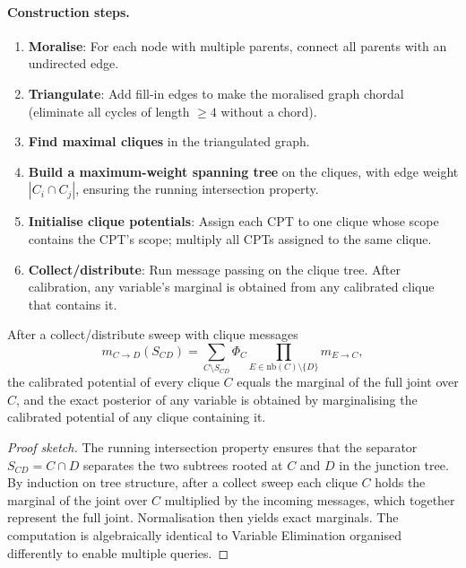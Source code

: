 \paragraph{Construction steps.}
\begin{enumerate}
\item \textbf{Moralise}: For each node with multiple parents, connect all
      parents with an undirected edge.
\item \textbf{Triangulate}: Add fill-in edges to make the moralised graph
      chordal (eliminate all cycles of length $\geq4$ without a chord).
\item \textbf{Find maximal cliques} in the triangulated graph.
\item \textbf{Build a maximum-weight spanning tree} on the cliques, with
      edge weight $|C_i\cap C_j|$, ensuring the running intersection
      property.
\item \textbf{Initialise clique potentials}: Assign each CPT to one clique
      whose scope contains the CPT's scope; multiply all CPTs assigned to
      the same clique.
\item \textbf{Collect/distribute}: Run message passing on the clique tree.
      After calibration, any variable's marginal is obtained from any
      calibrated clique that contains it.
\end{enumerate}

\begin{theorem}
After a collect/distribute sweep with clique messages
\[
m_{C\to D}(S_{CD})
=\sum_{C\setminus S_{CD}}\Phi_C\prod_{E\in\mathrm{nb}(C)\setminus\{D\}} m_{E\to C},
\]
the calibrated potential of every clique $C$ equals the marginal of the
full joint over $C$, and the exact posterior of any variable is obtained
by marginalising the calibrated potential of any clique containing it.
\end{theorem}

\begin{proof}[Proof sketch]
The running intersection property ensures that the separator $S_{CD}=C\cap D$
separates the two subtrees rooted at $C$ and $D$ in the junction tree.
By induction on tree structure, after a collect sweep each clique $C$
holds the marginal of the joint over $C$ multiplied by the incoming
messages, which together represent the full joint. Normalisation then
yields exact marginals. The computation is algebraically identical to
Variable Elimination organised differently to enable multiple queries.
\end{proof}


